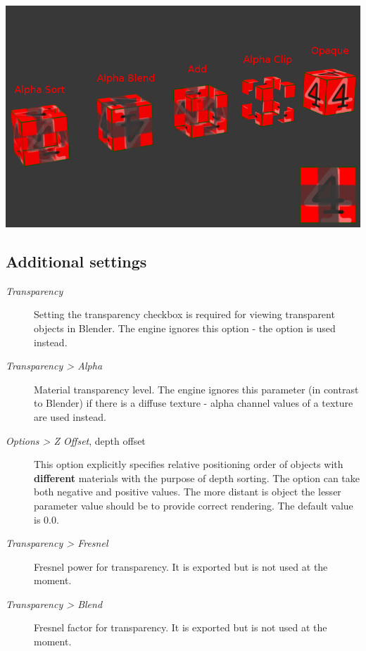 \documentclass[a4paper,12pt,oneside]{sphinxmanual}
\begin{document}
{\hfill\includegraphics[width=1.000\linewidth]{alpha_types.jpg}\hfill}


\subsection{Additional settings}
\label{materials:index-4}\label{materials:id5}\begin{description}
\item[{\emph{Transparency}}] \leavevmode
Setting the transparency checkbox is required for viewing transparent objects in Blender. The engine ignores this option - the  option is used instead.

\item[{\emph{Transparency \textgreater{} Alpha}}] \leavevmode
Material transparency level. The engine ignores this parameter (in contrast to Blender) if there is a diffuse texture - alpha channel values of a texture are used instead.

\item[{\emph{Options \textgreater{} Z Offset}, depth offset}] \leavevmode
This option explicitly specifies relative positioning order of objects with \textbf{different} materials with the purpose of depth sorting. The option can take both negative and positive values. The more distant is object the lesser parameter value should be to provide correct rendering. The default value is 0.0.

\item[{\emph{Transparency \textgreater{} Fresnel}}] \leavevmode
Fresnel power for transparency. It is exported but is not used at the moment.

\item[{\emph{Transparency \textgreater{} Blend}}] \leavevmode
Fresnel factor for transparency. It is exported but is not used at the moment.

\end{description}
\end{document}
